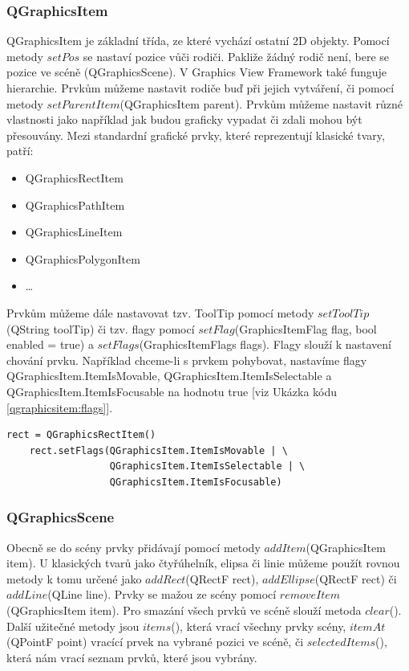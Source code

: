 \subsubsection*{QGraphicsItem}
QGraphicsItem je základní třída, ze které vychází ostatní 2D objekty. Pomocí metody $setPos$ se nastaví pozice vůči rodiči. Pakliže žádný rodič není, bere se pozice ve scéně (QGraphicsScene). V Graphics View Framework také funguje hierarchie. Prvkům můžeme nastavit rodiče buď při jejich vytváření, či pomocí metody $setParentItem$(QGraphicsItem parent). Prvkům můžeme nastavit různé vlastnosti jako například jak budou graficky vypadat či zdali mohou být přesouvány. Mezi standardní grafické prvky, které reprezentují klasické tvary, patří:\\
\begin{itemize}
	\item QGraphicsRectItem
	\item QGraphicsPathItem
	\item QGraphicsLineItem
	\item QGraphicsPolygonItem
	\item \ldots
\end{itemize}
 
Prvkům můžeme dále nastavovat tzv. ToolTip pomocí metody $setToolTip$(QString toolTip) či tzv. flagy pomocí $setFlag$(GraphicsItemFlag flag, bool enabled = true) a $setFlags$(GraphicsItemFlags flags). Flagy slouží k nastavení chování prvku. Například chceme-li s prvkem pohybovat, nastavíme flagy QGraphicsItem.ItemIsMovable, QGraphicsItem.ItemIsSelectable a QGraphicsItem.ItemIsFocusable na hodnotu true [viz Ukázka kódu \ref{qgraphicsitem:flags}].\\
 
\begin{lstlisting}[label=qgraphicsitem:flags,caption={Nastavení flagů u QGraphicsRectItem}, morekeywords={QGraphicsItem, QGraphicsRectItem}] 
	rect = QGraphicsRectItem()
	rect.setFlags(QGraphicsItem.ItemIsMovable | \
				  QGraphicsItem.ItemIsSelectable | \
				  QGraphicsItem.ItemIsFocusable)
\end{lstlisting}
 
\subsubsection*{QGraphicsScene}
Obecně se do scény prvky přidávají pomocí metody $addItem$(QGraphicsItem item). U klasických tvarů jako čtyřúhelník, elipsa či linie můžeme použít rovnou metody k tomu určené jako $addRect$(QRectF rect), $addEllipse$(QRectF rect) či $addLine$(QLine line). Prvky se mažou ze scény pomocí $removeItem$(QGraphicsItem item). Pro smazání všech prvků ve scéně slouží metoda $clear$(). Další užitečné metody jsou $items$(), která vrací všechny prvky scény, $itemAt$(QPointF point) vracící prvek na vybrané pozici ve scéně, či $selectedItems$(), která nám vrací seznam prvků, které jsou vybrány.


